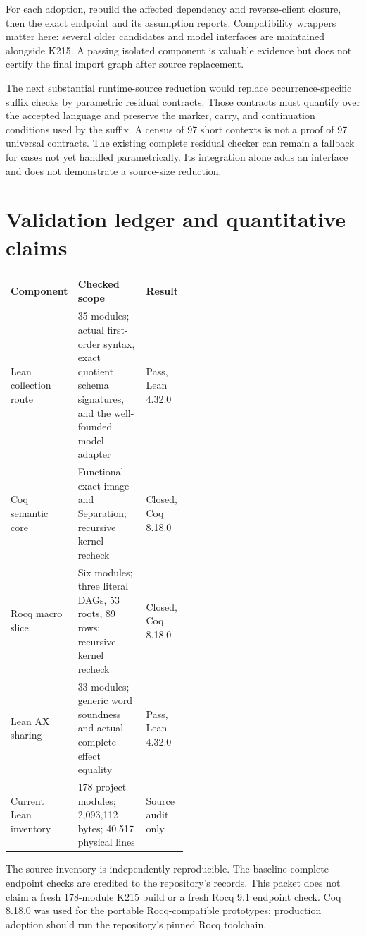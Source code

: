 \documentclass[11pt,letterpaper]{article}
\newcommand{\code}[1]{\texttt{\detokenize{#1}}}
\begin{document}
For each adoption, rebuild the affected dependency and reverse-client closure,
then the exact endpoint and its assumption reports. Compatibility wrappers
matter here: several older candidates and model interfaces are maintained
alongside K215. A passing isolated component is valuable evidence but does
not certify the final import graph after source replacement.

The next substantial runtime-source reduction would replace
occurrence-specific suffix checks by parametric residual contracts.
Those contracts must quantify over the accepted \code{RolePath} language
and preserve the marker, carry, and continuation conditions used by the
suffix. A census of 97 short contexts is not a proof of 97 universal
contracts. The existing complete residual checker can remain a fallback
for cases not yet handled parametrically. Its integration alone adds an
interface and does not demonstrate a source-size reduction.\cite{residual}

\section{Validation ledger and quantitative claims}

\begin{center}
\small
\begin{tabularx}{\linewidth}{@{}L{0.27\linewidth}YL{0.23\linewidth}@{}}
\toprule
Component & Checked scope & Result\\
\midrule
Lean collection route &
35 modules; actual first-order syntax, exact quotient schema signatures, and the well-founded model adapter &
Pass, Lean 4.32.0\\
Coq semantic core &
Functional exact image and Separation; recursive kernel recheck &
Closed, Coq 8.18.0\\
Rocq macro slice &
Six modules; three literal DAGs, 53 roots, 89 rows; recursive kernel recheck &
Closed, Coq 8.18.0\\
Lean AX sharing &
33 modules; generic word soundness and actual complete effect equality &
Pass, Lean 4.32.0\\
Current Lean inventory &
178 project modules; 2,093,112 bytes; 40,517 physical lines &
Source audit only\\
\bottomrule
\end{tabularx}
\end{center}

The source inventory is independently reproducible. The baseline complete
endpoint checks are credited to the repository's records. This packet
does not claim a fresh 178-module K215 build or a fresh Rocq 9.1 endpoint
check. Coq 8.18.0 was used for the portable Rocq-compatible prototypes;
production adoption should run the repository's pinned Rocq toolchain.
\end{document}
